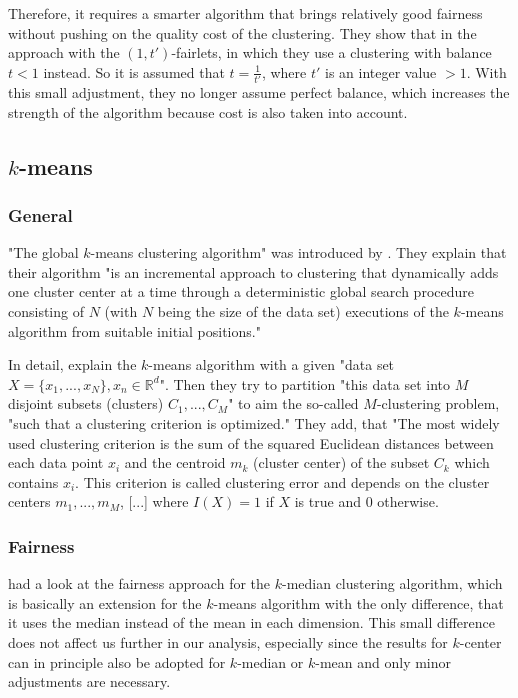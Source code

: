 Therefore, it requires a smarter algorithm that brings relatively good fairness without pushing on the quality cost of the clustering. They show that in the approach with the $(1,t')$-fairlets, in which they use a clustering with balance $t < 1$ instead. So it is assumed that $t = \frac{1}{t'}$, where $t'$ is an integer value $> 1$. \autocite[6]{Chierichetti2018} With this small adjustment, they no longer assume perfect balance, which increases the strength of the algorithm because cost is also taken into account.


\subsection{$k$-means}
\label{k-means}

\subsubsection{General}

"The global $k$-means clustering algorithm" was introduced by \textcite[]{Likas2003}. They explain that their algorithm "is an incremental approach to clustering that dynamically adds one cluster center at a time through a deterministic global search procedure consisting of $N$ (with $N$ being the size of the data set) executions of the $k$-means algorithm from suitable initial positions." \autocite[1]{Likas2003}

In detail, \textcite[2]{Likas2003} explain the $k$-means algorithm with a given "data set $X = \{x_{1},...,x_{N}\},x_{n} \in \mathbb{R}^d$". Then they try to partition "this data set into $M$ disjoint subsets (clusters) $C_{1},...,C_{M}$" to aim the so-called $M$-clustering problem, "such that a clustering criterion is optimized." They add, that "The most widely used clustering criterion is the sum of the squared Euclidean distances between each data point $x_{i}$ and the centroid $m_{k}$ (cluster center) of the subset $C_{k}$ which contains $x_{i}$. This criterion is called clustering error and depends on the cluster centers $m_{1},...,m_{M}$, [...] where $I(X) = 1$ if $X$ is true and $0$ otherwise.

\subsubsection{Fairness}

\textcite[]{Chierichetti2018} had a look at the fairness approach for the $k$-median clustering algorithm, which is basically an extension for the $k$-means algorithm with the only difference, that it uses the median instead of the mean in each dimension. \autocite[]{Jain1988} This small difference does not affect us further in our analysis, especially since the results for $k$-center can in principle also be adopted for $k$-median or $k$-mean and only minor adjustments are necessary.

